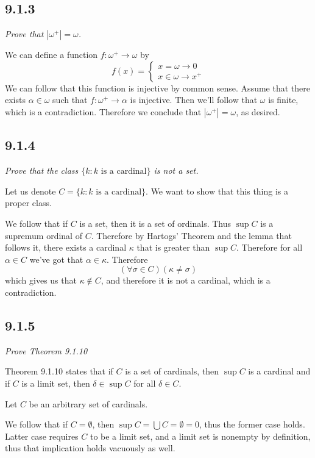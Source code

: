 \documentclass[11pt,oneside,titlepage]{book}
\newcommand{\set}[1]{\{ #1 \}}
\begin{document}
\subsection*{9.1.3}

\textit{Prove that $|\omega^+| = \omega$.}

We can define a function $f: \omega^+ \to \omega$ by
$$f(x) =
\begin{cases}
  x = \omega \to 0 \\
  x \in \omega \to x^+
\end{cases}
$$
We can follow that this function is injective by common sense. Assume that there
exists $\alpha \in \omega$ such that $f: \omega^+ \to \alpha$ is injective. Then we'll
follow that $\omega$ is finite, which is a contradiction. Therefore we conclude that
$|\omega^+| = \omega$, as desired.

\subsection*{9.1.4}

\textit{Prove that the class $\set{k: k \text{ is a cardinal}}$ is not a set.}

Let  us denote $C = \set{k: k \text{ is a cardinal}}$. We want to show that this thing is a
proper class.

We follow that if $C$ is a set, then it is a set of ordinals. Thus
$\sup C$ is a supremum ordinal of $C$. Therefore by Hartogs' Theorem and the lemma
that follows it, there exists
a cardinal $\kappa$ that is greater than $\sup C$. Therefore for all $\alpha \in C$
we've got that $\alpha \in \kappa$. Therefore
$$(\forall \sigma \in C)(\kappa \neq \sigma)$$
which gives us that $\kappa \notin C$, and therefore it is not a cardinal,
which is a contradiction.

\subsection*{9.1.5}

\textit{Prove Theorem 9.1.10}

Theorem 9.1.10 states that if $C$ is a  set of cardinals, then
$\sup C$ is a cardinal and if $C$ is a limit set, then $\delta \in \sup C$ for all $\delta \in C$.

Let $C$ be an arbitrary set of cardinals.

We follow that if $C = \emptyset$, then
$\sup C = \bigcup C = \emptyset = 0$, thus the former case holds. Latter case requires $C$ to
be a limit set, and a limit set is nonempty by definition, thus that implication holds vacuously
as well.
\end{document}
